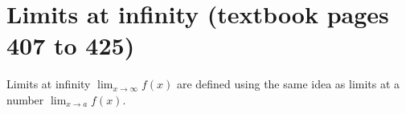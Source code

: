 \documentclass[../main.tex]{subfiles}
\begin{document}
 \section{Limits at infinity (textbook pages 407 to 425)}

%
%   
%
%
%

\faLightbulb{} Limits at infinity \(\lim_{x \to \infty} f(x)\) are defined using the same idea as limits at a number \(\lim_{x \to a} f(x)\).
\end{document}
